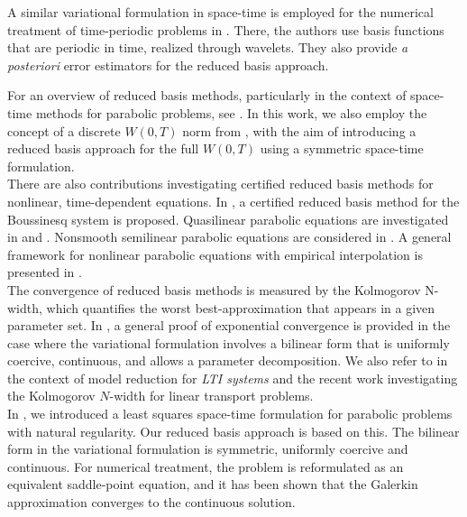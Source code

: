 \documentclass{article}
\theoremstyle{plain}
\theoremstyle{definition}
\theoremstyle{remark}
\begin{document}
A similar variational formulation in space-time is employed for the numerical treatment of time-periodic problems in \cite{STEIH2012710}. There, the authors use basis functions that are periodic in time, realized through wavelets. They also provide \textit{a posteriori} error estimators for the reduced basis approach.

For an overview of reduced basis methods, particularly in the context of space-time methods for parabolic problems, see \cite[§~1.4.2]{Hinze2023RB}.
In this work, we also employ the concept of a discrete $W(0, T)$ norm from \cite{urban2014improved}, with the aim of introducing a reduced basis approach for the full $W(0, T)$ using a symmetric space-time formulation.\\

There are also contributions investigating certified reduced basis methods for nonlinear, time-dependent equations. In \cite{yano2014space}, a certified reduced basis method for the Boussinesq system is proposed. Quasilinear parabolic equations are investigated in \cite{HK21} and \cite{hoppe2024posteriori}. Nonsmooth semilinear parabolic equations are considered in \cite{bernreuther2024adaptive}. A general framework for nonlinear parabolic equations with empirical interpolation is presented in \cite{benaceur2018progressive}.\\

The convergence of reduced basis methods is measured by the Kolmogorov N-width, which quantifies the worst best-approximation that appears in a given parameter set. 
In \cite[Thm.~3.1]{ohlberger}, a general proof of exponential convergence is provided in the case where the variational formulation involves a bilinear form that is uniformly coercive, continuous, and allows a parameter decomposition. We also refer to \cite{unger2019kolmogorov} in the context of model reduction for \textit{LTI systems} and the recent work \cite{arbes2025kolmogorov} investigating the Kolmogorov $N$-width for linear transport problems.\\


In \cite{preprint_SP}, we introduced a least squares space-time formulation for parabolic problems with natural regularity. Our reduced basis approach is based on this. The bilinear form in the variational formulation is symmetric, uniformly coercive and continuous.
For numerical treatment, the problem is reformulated as an equivalent saddle-point equation, and it has been shown that the Galerkin approximation converges to the continuous solution.
\end{document}

